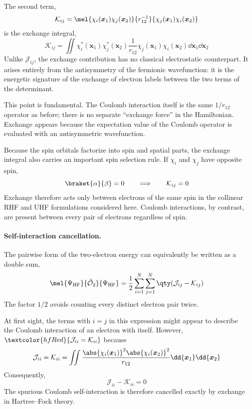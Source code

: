 \documentclass[11pt,a4paper,titlepage]{article}
\numberwithin{equation}{section}
\newcommand{\bx}{\boldsymbol{x}}
\newcommand{\chO}{\Hat{\mathcal{O}}}
\newcommand{\cJ}{\mathcal{J}}
\newcommand{\cK}{\mathcal{K}}
\newcommand{\red}[1]{\textcolor{hfRed}{#1}}
\begin{document}
The second term,
\begin{equation}
  \cK_{ij}
  =
  \mel{\chi_i(\bx_1)\chi_j(\bx_2)}{r_{12}^{-1}}
       {\chi_j(\bx_1)\chi_i(\bx_2)}
\end{equation}
is the \red{exchange integral},
\begin{equation}
  \cK_{ij}
  =
  \iint
  \chi_i^*(\bx_1)\chi_j^*(\bx_2)
  \frac{1}{r_{12}}
  \chi_j(\bx_1)\chi_i(\bx_2)
  \dd{\bx_1}\dd{\bx_2}
  \label{eq:exchange-integral}
\end{equation}
Unlike $\cJ_{ij}$, the exchange contribution has no classical electrostatic
counterpart. It arises entirely from the antisymmetry of the fermionic
wavefunction: it is the energetic signature of the exchange of electron
labels between the two terms of the determinant.

This point is fundamental. The Coulomb interaction itself is the same
$1/r_{12}$ operator as before; there is no separate ``exchange force'' in the
Hamiltonian. Exchange appears because the expectation value of the Coulomb
operator is evaluated with an antisymmetric wavefunction.

Because the spin orbitals factorize into spin and spatial parts, the exchange
integral also carries an important spin selection rule. If $\chi_i$ and
$\chi_j$ have opposite spin,
\begin{equation}
  \braket{\alpha}{\beta}=0
  \qquad\Longrightarrow\qquad
  \cK_{ij}=0
\end{equation}
Exchange therefore acts only between electrons of the same spin in the
collinear RHF and UHF formulations considered here. Coulomb interactions, by
contrast, are present between every pair of electrons regardless of spin.

\paragraph{Self-interaction cancellation.}

The pairwise form of the two-electron energy can equivalently be written as a
double sum,
\begin{equation}
  \mel{\Psi_\text{HF}}{\chO_2}{\Psi_\text{HF}}
  =
  \frac{1}{2}
  \sum_{i=1}^{N}
  \sum_{j=1}^{N}
  \qty(
    \cJ_{ij}-\cK_{ij}
  )
  \label{eq:hf-double-sum}
\end{equation}
The factor $1/2$ avoids counting every distinct electron pair twice.

At first sight, the terms with $i=j$ in this expression might appear to
describe the Coulomb interaction of an electron with itself. However,
  $\red{
  \cJ_{ii}=\cK_{ii}
  }$
because
\begin{equation}
  \cJ_{ii}
  =
  \cK_{ii}
  =
  \iint
  \frac{
  \abs{\chi_i(\bx_1)}^2
  \abs{\chi_i(\bx_2)}^2
  }{r_{12}}
  \dd{\bx_1}\dd{\bx_2}
\end{equation}
Consequently,
\begin{equation}
  \cJ_{ii}-\cK_{ii}=0
\end{equation}
The spurious Coulomb self-interaction is therefore cancelled exactly by
exchange in Hartree--Fock theory.
\end{document}
